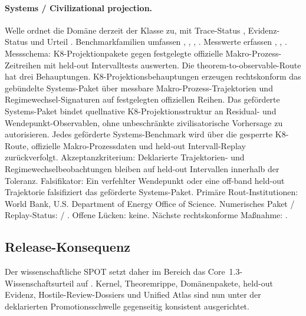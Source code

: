 \paragraph{Systems / Civilizational projection.}
Welle  ordnet die Domäne derzeit der Klasse  zu, mit Trace-Status , Evidenz-Status  und Urteil .
Benchmarkfamilien umfassen , \allowbreak {}, \allowbreak {}, \allowbreak {}.
Messwerte erfassen , \allowbreak {}, \allowbreak {}.
Messschema: K8-Projektionpakete gegen festgelegte offizielle Makro-Prozess-Zeitreihen mit held-out Intervalltests auswerten.
Die theorem-to-observable-Route hat drei Behauptungen. K8-Projektionsbehauptungen erzeugen rechtskonform das gebündelte Systems-Paket über messbare Makro-Prozess-Trajektorien und Regimewechsel-Signaturen auf festgelegten offiziellen Reihen. Das geförderte Systems-Paket bindet quellnative K8-Projektionsstruktur an Residual- und Wendepunkt-Observablen, ohne unbeschränkte zivilisatorische Vorhersage zu autorisieren. Jedes geförderte Systems-Benchmark wird über die gesperrte K8-Route, offizielle Makro-Prozessdaten und held-out Intervall-Replay zurückverfolgt.
Akzeptanzkriterium: Deklarierte Trajektorien- und Regimewechselbeobachtungen bleiben auf held-out Intervallen innerhalb der Toleranz.
Falsifikator: Ein verfehlter Wendepunkt oder eine off-band held-out Trajektorie falsifiziert das geförderte Systems-Paket.
Primäre Rout-Institutionen: World Bank, \allowbreak U.S. Department of Energy Office of Science.
Numerisches Paket / Replay-Status:  / .
Offene Lücken: keine.
Nächste rechtskonforme Maßnahme: .

\subsection{Release-Konsequenz}
Der wissenschaftliche SPOT setzt daher im Bereich  das Core~1.3-Wissenschaftsurteil auf .
Kernel, Theoremrippe, Domänenpakete, held-out Evidenz, Hostile-Review-Dossiers und Unified Atlas sind nun unter der deklarierten Promotionsschwelle gegenseitig konsistent ausgerichtet.
